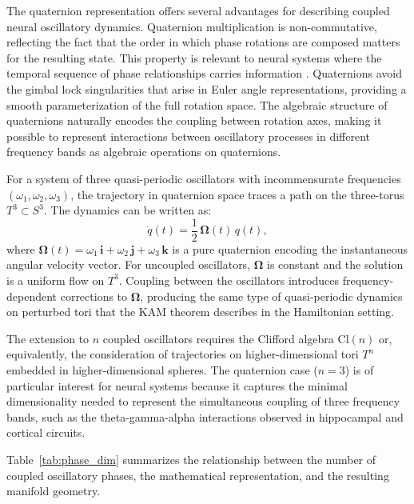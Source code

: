 \documentclass[12pt,a4paper]{article}
\makeatletter
\let\orig@subsection\subsection
\renewcommand{\subsection}{\@ifstar{\orig@subsection*}{\@dblarg{\my@subsection}}}
\def\my@subsection[#1]#2{\orig@subsection[#1]{#2}\noindent\@afterindentfalse\@afterheading}
\makeatother
\begin{document}
The quaternion representation offers several advantages for describing coupled neural oscillatory dynamics.
Quaternion multiplication is non-commutative, reflecting the fact that the order in which phase rotations are composed matters for the resulting state.
This property is relevant to neural systems where the temporal sequence of phase relationships carries information \cite{Lisman2005}.
Quaternions avoid the gimbal lock singularities that arise in Euler angle representations, providing a smooth parameterization of the full rotation space.
The algebraic structure of quaternions naturally encodes the coupling between rotation axes, making it possible to represent interactions between oscillatory processes in different frequency bands as algebraic operations on quaternions.

\subsection{Quaternion Dynamics and the Three-Torus}

For a system of three quasi-periodic oscillators with incommensurate frequencies $(\omega_1, \omega_2, \omega_3)$, the trajectory in quaternion space traces a path on the three-torus $T^3 \subset S^3$.
The dynamics can be written as:
\begin{equation}\label{eq:quat_dynamics}
  \dot{q}(t) = \frac{1}{2}\,\bm{\Omega}(t)\,q(t),
\end{equation}
where $\bm{\Omega}(t) = \omega_1\,\mathbf{i} + \omega_2\,\mathbf{j} + \omega_3\,\mathbf{k}$ is a pure quaternion encoding the instantaneous angular velocity vector.
For uncoupled oscillators, $\bm{\Omega}$ is constant and the solution is a uniform flow on $T^3$.
Coupling between the oscillators introduces frequency-dependent corrections to $\bm{\Omega}$, producing the same type of quasi-periodic dynamics on perturbed tori that the KAM theorem describes in the Hamiltonian setting.

The extension to $n$ coupled oscillators requires the Clifford algebra $\mathrm{Cl}(n)$ or, equivalently, the consideration of trajectories on higher-dimensional tori $T^n$ embedded in higher-dimensional spheres.
The quaternion case ($n = 3$) is of particular interest for neural systems because it captures the minimal dimensionality needed to represent the simultaneous coupling of three frequency bands, such as the theta-gamma-alpha interactions observed in hippocampal and cortical circuits.

Table~\ref{tab:phase_dim} summarizes the relationship between the number of coupled oscillatory phases, the mathematical representation, and the resulting manifold geometry.
\end{document}
